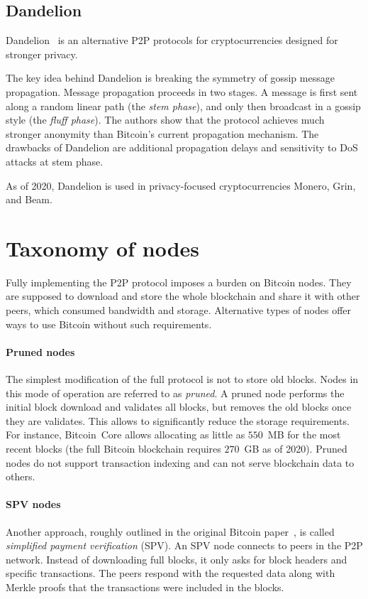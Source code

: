 \subsection{Dandelion}
\label{sec:Dandelion}

Dandelion~\cite{Venkatakrishnan2017, Fanti2018} is an alternative P2P protocols for cryptocurrencies designed for stronger privacy.

The key idea behind Dandelion is breaking the symmetry of gossip message propagation.
Message propagation proceeds in two stages.
A message is first sent along a random linear path (the \textit{stem phase}), and only then broadcast in a gossip style (the \textit{fluff phase}).
The authors show that the protocol achieves much stronger anonymity than Bitcoin's current propagation mechanism.
The drawbacks of Dandelion are additional propagation delays and sensitivity to DoS attacks at stem phase. 

As of 2020, Dandelion is used in privacy-focused cryptocurrencies Monero, Grin, and Beam.


\section{Taxonomy of nodes}

Fully implementing the P2P protocol imposes a burden on Bitcoin nodes.
They are supposed to download and store the whole blockchain and share it with other peers, which consumed bandwidth and storage.
Alternative types of nodes offer ways to use Bitcoin without such requirements.

\paragraph{Pruned nodes}
The simplest modification of the full protocol is not to store old blocks.
Nodes in this mode of operation are referred to as \textit{pruned}.
A pruned node performs the initial block download and validates all blocks, but removes the old blocks once they are validates.
This allows to significantly reduce the storage requirements.
For instance, Bitcoin~Core allows allocating as little as $550$~MB for the most recent blocks (the full Bitcoin blockchain requires $270$~GB as of 2020).
Pruned nodes do not support transaction indexing and can not serve blockchain data to others.

\paragraph{SPV nodes}
Another approach, roughly outlined in the original Bitcoin paper~\cite{Nakamoto2008}, is called \textit{simplified payment verification} (SPV).
An SPV node connects to peers in the P2P network.
Instead of downloading full blocks, it only asks for block headers and specific transactions.
The peers respond with the requested data along with Merkle proofs that the transactions were included in the blocks.

